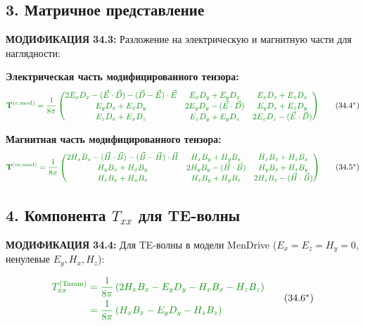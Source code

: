 \documentclass[a4paper,12pt]{article}
\newcommand{\modtext}[1]{\textcolor{modcolor}{#1}}
\newcommand{\modmath}[1]{\textcolor{modcolor}{#1}}
\newcommand{\modblock}[1]{\colorbox{modcolor!10}{\parbox{\dimexpr\linewidth-2\fboxsep}{#1}}}
\begin{document}
\subsection*{3. Матричное представление}

\modtext{
\textbf{МОДИФИКАЦИЯ 34.3:} Разложение на электрическую и магнитную части
для наглядности:
}

\textbf{Электрическая часть модифицированного тензора:}
\begin{equation}
\modmath{
\mathbf{T}^{(e,\text{mod})} = \frac{1}{8\pi}
\begin{pmatrix}
2E_x D_x - (\vec{E}\cdot\vec{D}) - (\vec{D}-\vec{E})\cdot\vec{E} &
E_x D_y + E_y D_x &
E_x D_z + E_z D_x \\
E_y D_x + E_x D_y &
2E_y D_y - (\vec{E}\cdot\vec{D}) &
E_y D_z + E_z D_y \\
E_z D_x + E_x D_z &
E_z D_y + E_y D_z &
2E_z D_z - (\vec{E}\cdot\vec{D})
\end{pmatrix}
}
\tag{34.4$^*$}
\end{equation}

\textbf{Магнитная часть модифицированного тензора:}
\begin{equation}
\modmath{
\mathbf{T}^{(m,\text{mod})} = \frac{1}{8\pi}
\begin{pmatrix}
2H_x B_x - (\vec{H}\cdot\vec{B}) - (\vec{B}-\vec{H})\cdot\vec{H} &
H_x B_y + H_y B_x &
H_x B_z + H_z B_x \\
H_y B_x + H_x B_y &
2H_y B_y - (\vec{H}\cdot\vec{B}) &
H_y B_z + H_z B_y \\
H_z B_x + H_x B_z &
H_z B_y + H_y B_z &
2H_z B_z - (\vec{H}\cdot\vec{B})
\end{pmatrix}
}
\tag{34.5$^*$}
\end{equation}

\subsection*{4. Компонента $T_{xx}$ для TE-волны}

\modtext{
\textbf{МОДИФИКАЦИЯ 34.4:} Для TE-волны в модели MenDrive
($E_x = E_z = H_y = 0$, ненулевые $E_y, H_x, H_z$):
}

\begin{equation}
\modmath{
\begin{aligned}
T_{xx}^{\text{(Tamm)}} &= \frac{1}{8\pi}\left(
2H_x B_x - E_y D_y - H_x B_x - H_z B_z
\right) \\
&= \frac{1}{8\pi}\left(
H_x B_x - E_y D_y - H_z B_z
\right)
\end{aligned}
}
\tag{34.6$^*$}
\end{equation}
\end{document}
